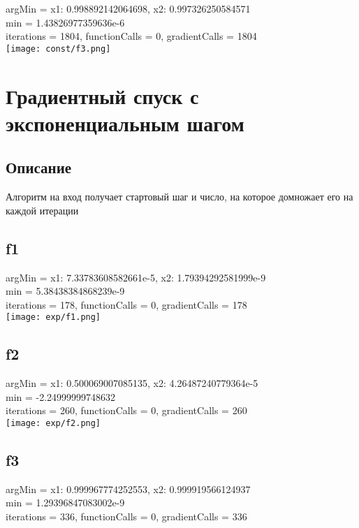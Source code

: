 \documentclass{article}
\begin{document}
argMin = {x1: 0.998892142064698, x2: 0.997326250584571} \\
min =  1.43826977359636e-6 \\
iterations = 1804, functionCalls = 0, gradientCalls = 1804 \\

\texttt{[image: const/f3.png]} \\

\section{Градиентный спуск с экспоненциальным шагом}

\subsection{Описание}
Алгоритм на вход получает стартовый шаг и число, на которое домножает его на каждой итерации

\subsection{f1}

argMin = {x1: 7.33783608582661e-5, x2: 1.79394292581999e-9} \\
min =  5.38438384868239e-9 \\
iterations = 178, functionCalls = 0, gradientCalls = 178 \\

\texttt{[image: exp/f1.png]} \\

\subsection{f2}

argMin = {x1: 0.500069007085135, x2: 4.26487240779364e-5} \\
min =  -2.24999999748632 \\
iterations = 260, functionCalls = 0, gradientCalls = 260 \\

\texttt{[image: exp/f2.png]} \\

\subsection{f3}

argMin = {x1: 0.999967774252553, x2: 0.999919566124937} \\
min =  1.29396847083002e-9 \\
iterations = 336, functionCalls = 0, gradientCalls = 336 \\
\end{document}
